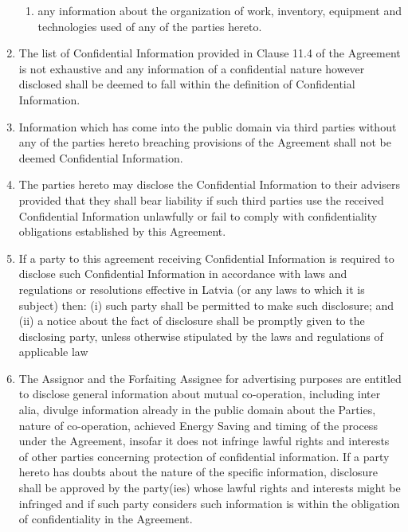 \documentclass[a4paper]{article}
\begin{document}
\begin{multicols}{2}
\begin{enumerate}
\begin{enumerate}
    \item{any information about the organization of work, inventory,
        equipment and technologies used of any of the parties hereto.}
    \end{enumerate}

  \item{The list of Confidential Information provided in Clause 11.4
      of the Agreement is not exhaustive and any information of a
      confidential nature however disclosed shall be deemed to fall
      within the definition of Confidential Information.}

  \item{Information which has come into the public domain via third
      parties without any of the parties hereto breaching provisions
      of the Agreement shall not be deemed Confidential Information.}

  \item{The parties hereto may disclose the Confidential Information
      to their advisers provided that they shall bear liability if
      such third parties use the received Confidential Information
      unlawfully or fail to comply with confidentiality obligations
      established by this Agreement.}

  \item{If a party to this agreement receiving Confidential
      Information is required to disclose such Confidential
      Information in accordance with laws and regulations or
      resolutions effective in Latvia (or any laws to which it is
      subject) then: (i) such party shall be permitted to make such
      disclosure; and (ii) a notice about the fact of disclosure shall
      be promptly given to the disclosing party, unless otherwise
      stipulated by the laws and regulations of applicable law}

  \item{The Assignor and the Forfaiting Assignee for advertising
      purposes are entitled to disclose general information about
      mutual co{-}operation, including inter alia, divulge information
      already in the public domain about the Parties, nature of
      co{-}operation, achieved Energy Saving and timing of the process
      under the Agreement, insofar it does not infringe lawful rights
      and interests of other parties concerning protection of
      confidential information. If a party hereto has doubts about the
      nature of the specific information, disclosure shall be approved
      by the party(ies) whose lawful rights and interests might be
      infringed and if such party considers such information is within
      the obligation of confidentiality in the Agreement.}


\end{enumerate}
\end{multicols}
\end{document}
